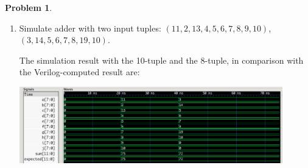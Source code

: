 \documentclass[10pt]{article}
\theoremstyle{definition}
\newtheorem{problem}{Problem}
\begin{document}
\begin{problem}
\begin{enumerate}
      \item Simulate adder with two input tuples: $(11, 2, 13, 4, 5, 6, 7, 8, 9, 10)$, $(3, 14, 5, 6, 7, 8, 19, 10)$.

      The simulation result with the 10-tuple and the 8-tuple, in comparison with the Verilog-computed result are:

            \includegraphics*[width=0.9\textwidth] {csa_10_8-screenshot.png}

    \end{enumerate}
  \end{problem}

  \newpage
\end{document}
